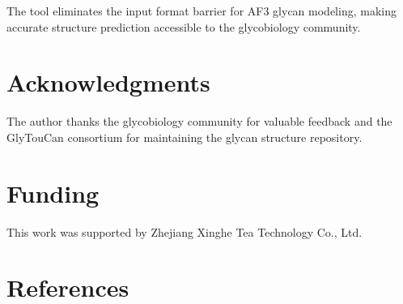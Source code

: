 The tool eliminates the input format barrier for AF3 glycan modeling, making accurate structure prediction accessible to the glycobiology community.

\section*{Acknowledgments}

The author thanks the glycobiology community for valuable feedback and the GlyTouCan consortium for maintaining the glycan structure repository.

\section*{Funding}

This work was supported by Zhejiang Xinghe Tea Technology Co., Ltd.

\section*{References}





